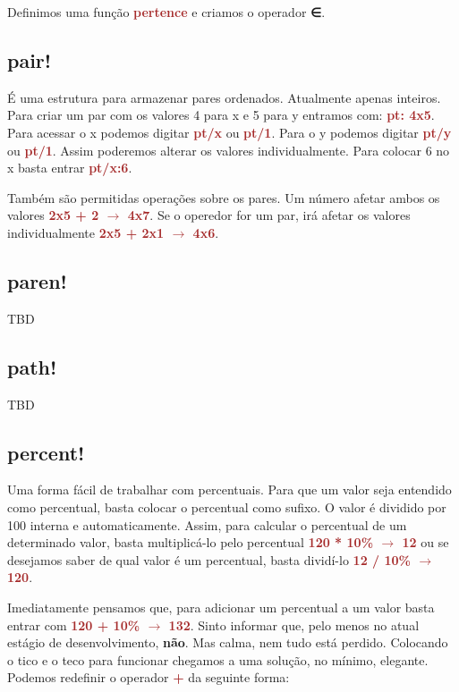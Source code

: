 \documentclass[12pt,a4paper]{article}
\newcommand{\incss}[1]{
  \ttfamily\small
  \begin{shaded}
    \VerbatimInput{./fragmentos/#1.ss}
  \end{shaded}
  \normalfont
}
\newcommand{\codigo}[1]{\ttfamily\small\textcolor{Brown}{\textbf{#1}}\normalfont}
\begin{document}
\incss{repl-makeop}

Definimos uma função \codigo{pertence} e criamos o operador \textbf{∈}. 

\subsection{pair!}


É uma estrutura para armazenar pares ordenados. Atualmente apenas inteiros. Para
criar um par com os valores 4 para x e 5 para y entramos com: \codigo{pt: 4x5}.
Para acessar o x podemos digitar \codigo{pt/x} ou \codigo{pt/1}. Para o y
podemos digitar \codigo{pt/y} ou \codigo{pt/1}. Assim poderemos alterar os
valores individualmente. Para colocar 6 no x basta entrar \codigo{pt/x:6}.

Também são permitidas operações sobre os pares. Um número afetar ambos os
valores \codigo{2x5 + 2 $\rightarrow$ 4x7}. Se o operedor for um par,
irá afetar os valores individualmente \codigo{2x5 + 2x1 $\rightarrow$ 4x6}.

\subsection{paren!}

TBD

\subsection{path!}

TBD

\subsection{percent!}

Uma forma fácil de trabalhar com percentuais. Para que um valor seja entendido
como percentual, basta colocar o percentual como sufixo. O valor é dividido por
100 interna e automaticamente. Assim, para calcular o percentual de um
determinado valor, basta multiplicá-lo pelo percentual \codigo{120 * 10\%
 $\rightarrow$ 12} ou se desejamos saber de qual valor é um percentual, basta
dividí-lo \codigo{12 / 10\% $\rightarrow$ 120}.

Imediatamente pensamos que, para adicionar um percentual a um valor basta entrar
com \codigo{120 + 10\% $\rightarrow$ 132}. Sinto informar que, pelo menos no
atual estágio de desenvolvimento, \textbf{não}. Mas calma, nem tudo está
perdido. Colocando o tico e o teco para funcionar chegamos a uma solução, no
mínimo, elegante. Podemos redefinir o operador \codigo{+} da seguinte forma:
\end{document}
